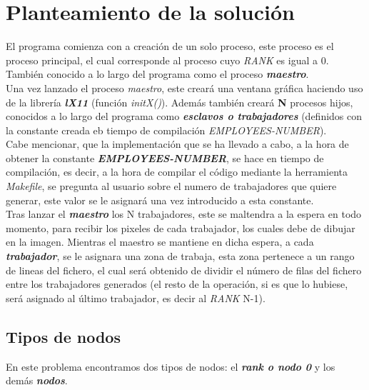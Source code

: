 \documentclass[11pt]{article}
\begin{document}
\section{Planteamiento de la solución}
El programa comienza con a creación de un solo proceso, este proceso es el proceso principal, el cual corresponde al proceso cuyo \textit{RANK} es igual a 0. También conocido a lo largo del programa como el proceso \textbf{\textit{maestro}}.\\
Una vez lanzado el proceso \textit{maestro}, este creará una ventana gráfica haciendo uso de la librería \textit{\textbf{lX11}} (función \textit{initX()}). Además también creará \textbf{N} procesos hijos, conocidos a lo largo del programa como \textit{\textbf{esclavos o trabajadores}} (definidos con la constante creada eb tiempo de compilación \textit{EMPLOYEES-NUMBER}).\\
Cabe mencionar, que la implementación que se ha llevado a cabo, a la hora de obtener la constante \textbf{\textit{EMPLOYEES-NUMBER}}, se hace en tiempo de compilación, es decir, a la hora de compilar el código mediante la herramienta \textit{Makefile}, se pregunta al usuario sobre el numero de trabajadores que quiere generar, este valor se le asignará una vez introducido a esta constante.\\
Tras lanzar el \textit{\textbf{maestro}} los N trabajadores, este se maltendra a la espera en todo momento, para recibir los pixeles de cada trabajador, los cuales debe de dibujar en la imagen.
Mientras el maestro se mantiene en dicha espera, a cada \textit{\textbf{trabajador}}, se le asignara una zona de trabaja, esta zona pertenece a un rango de lineas del fichero, el cual será obtenido de dividir el número de filas del fichero entre los trabajadores generados (el resto de la operación, si es que lo hubiese, será asignado al último trabajador, es decir al \textit{RANK} N-1).


\subsection{Tipos de nodos}
En este problema encontramos dos tipos de nodos: el \textbf{\textit{rank o nodo 0}} y los demás \textbf{\textit{nodos}}.
\end{document}
